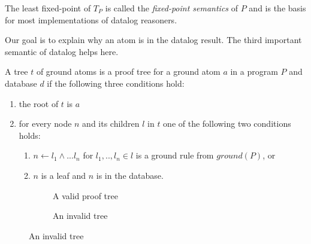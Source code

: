 The least fixed-point of $T_P$ is called the \textit{fixed-point semantics} of $P$ and is the basis for most implementations of datalog reasoners. 

Our goal is to explain why an atom is in the datalog result. The third important semantic of datalog helps here. 

A tree $t$ of ground atoms is a proof tree for a ground atom $a$ in a program $P$ and database $d$ if the following three conditions hold:

\begin{enumerate}
    \item the root of $t$ is $a$
    \item for every node $n$ and its children $l$ in $t$ one of the following two conditions holds: 
    \begin{enumerate}
        \item $n \leftarrow l_1 \land ... l_n$ for $l_1,.., l_n \in l$ is a ground rule from $ground(P)$, or
        \item $n$ is a leaf and $n$ is in the database.
    \end{enumerate}
\end{enumerate}

\begin{figure}
    \centering
    \begin{subfigure}[b]{0.45\linewidth}
    \label{prelim:validTree}
    \caption{A valid proof tree}
    \end{subfigure}
    \quad
    \begin{subfigure}[b]{0.45\linewidth}
        \caption{An invalid tree}
        \label{prelim:invalidTree}
    \end{subfigure}
    \end{figure}

